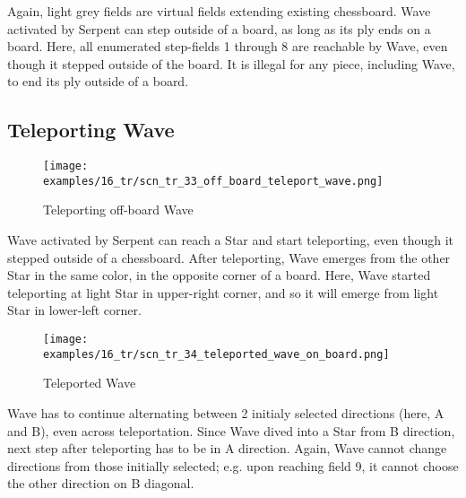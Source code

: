 Again, light grey fields are virtual fields extending existing chessboard.
Wave activated by Serpent can step outside of a board, as long as its ply
ends on a board. Here, all enumerated step-fields 1 through 8 are reachable
by Wave, even though it stepped outside of the board. It is illegal for any
piece, including Wave, to end its ply outside of a board.

\clearpage %

\subsection*{Teleporting Wave}
\label{sec:Tamoanchan Revisited/Serpent/Teleporting Wave}

\vspace*{-1.0\baselineskip}
\noindent
\begin{figure}[!h]
\texttt{[image: examples/16\_tr/scn\_tr\_33\_off\_board\_teleport\_wave.png]}
\caption{Teleporting off-board Wave}
\label{fig:scn_tr_33_off_board_teleport_wave}
\end{figure}

Wave activated by Serpent can reach a Star and start teleporting, even
though it stepped outside of a chessboard. After teleporting, Wave emerges
from the other Star in the same color, in the opposite corner of a board.
Here, Wave started teleporting at light Star in upper-right corner, and
so it will emerge from light Star in lower-left corner.

\clearpage %

\vspace*{-1.0\baselineskip}
\noindent
\begin{figure}[!h]
\texttt{[image: examples/16\_tr/scn\_tr\_34\_teleported\_wave\_on\_board.png]}
\caption{Teleported Wave}
\label{fig:scn_tr_34_teleported_wave_on_board}
\end{figure}

Wave has to continue alternating between 2 initialy selected directions (here,
A and B), even across teleportation. Since Wave dived into a Star from B direction,
next step after teleporting has to be in A direction. Again, Wave cannot change
directions from those initially selected; e.g. upon reaching field 9, it cannot
choose the other direction on B diagonal.

